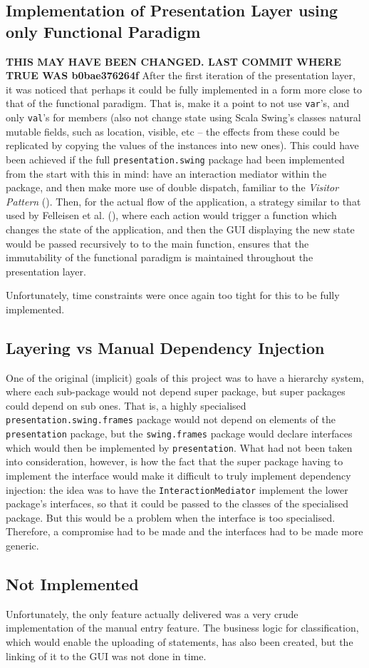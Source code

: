 \subsection{Implementation of Presentation Layer using only Functional Paradigm}
\textbf{THIS MAY HAVE BEEN CHANGED. LAST COMMIT WHERE TRUE WAS b0bae376264f}
After the first iteration of the presentation layer, it was noticed that
perhaps it could be fully implemented in a form more close to that of the
functional paradigm. That is, make it a point to not use \texttt{var}'s, and
only \texttt{val}'s for members (also not change state using Scala Swing's
classes natural mutable fields, such as location, visible, etc -- the effects
from these could be replicated by copying the values of the instances into new
ones). This could have been achieved if the full \texttt{presentation.swing}
package had been implemented from the start with this in mind: have an
interaction mediator within the package, and then make more use of double
dispatch, familiar to the \emph{Visitor Pattern}
(\cite[][Ch.~8,~Location~3943]{nikolov2016scala}). Then, for the actual flow of
the application, a strategy similar to that used by Felleisen et al.
(\citeyear[][Ch.~5]{felleisen2013realm}), where each action would trigger a
function which changes the state of the application, and then the GUI
displaying the new state would be passed recursively to to the main function,
ensures that the immutability of the functional paradigm is maintained
throughout the presentation layer.

Unfortunately, time constraints were once again too tight for this to be fully
implemented.

\subsection{Layering vs Manual Dependency Injection}
One of the original (implicit) goals of this project was to have a hierarchy
system, where each sub-package would not depend super package, but super
packages could depend on sub ones. That is, a highly specialised
\texttt{presentation.swing.frames} package would not depend on elements of the
\texttt{presentation} package, but the \texttt{swing.frames} package would
declare interfaces which would then be implemented by \texttt{presentation}.
What had not been taken into consideration, however, is how the fact that the
super package having to implement the interface would make it difficult to
truly implement dependency injection: the idea was to have the
\texttt{InteractionMediator} implement the lower package's interfaces, so that
it could be passed to the classes of the specialised package. But this would be
a problem when the interface is too specialised. Therefore, a compromise had to
be made and the interfaces had to be made more generic.

\subsection{Not Implemented}
Unfortunately, the only feature actually delivered was a very crude
implementation of the manual entry feature.
The business logic for classification, which would enable the uploading of statements, has also been created, but the linking of it to the GUI was not done in time.
